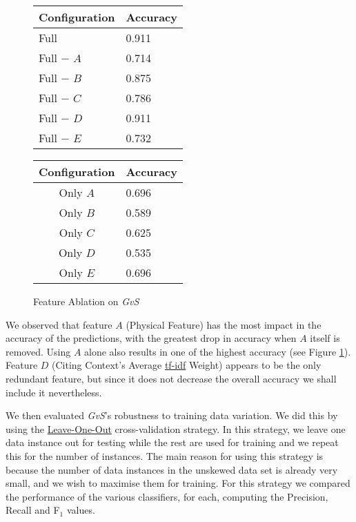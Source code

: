 \begin{figure}[ht]
\begin{minipage}[b]{0.45\linewidth}\centering
\begin{tabular}{ l | l }
Configuration & Accuracy \\
\hline
Full			& 0.911 \\
Full $-$ $A$	& 0.714 \\
Full $-$ $B$	& 0.875 \\
Full $-$ $C$	& 0.786 \\
Full $-$ $D$	& 0.911 \\
Full $-$ $E$	& 0.732 \\
\end{tabular}
\end{minipage}
\hspace{0.5cm}
\begin{minipage}[b]{0.45\linewidth}\centering
\begin{tabular}{ c | l }
Configuration & Accuracy \\
\hline
Only $A$	& 0.696 \\
Only $B$	& 0.589 \\
Only $C$	& 0.625 \\
Only $D$	& 0.535 \\
Only $E$	& 0.696 \\
\end{tabular}
\end{minipage}
\caption{Feature Ablation on {\it GvS}}
\label{fig:ablation_first}
\end{figure}

We observed that feature $A$ (Physical Feature) has the most impact in the accuracy of the predictions, with the greatest drop in accuracy when $A$ itself is removed.  Using $A$ alone also results in one of the highest accuracy (see Figure \ref{fig:ablation_first}). Feature $D$ (Citing Context's Average \url{tf-idf} Weight) appears to be the only redundant feature, but since it does not decrease the overall accuracy we shall include it nevertheless.

We then evaluated {\it GvS}'s robustness to training data variation.  We did this by using the \url{Leave-One-Out} cross-validation strategy. In this strategy, we leave one data instance out for testing while the rest are used for training and we repeat this for the number of instances. The main reason for using this strategy is because the number of data instances in the unskewed data set is already very small, and we wish to maximise them for training. For this strategy we compared the performance of the various classifiers, for each, computing the Precision, Recall and F$_1$ values.

